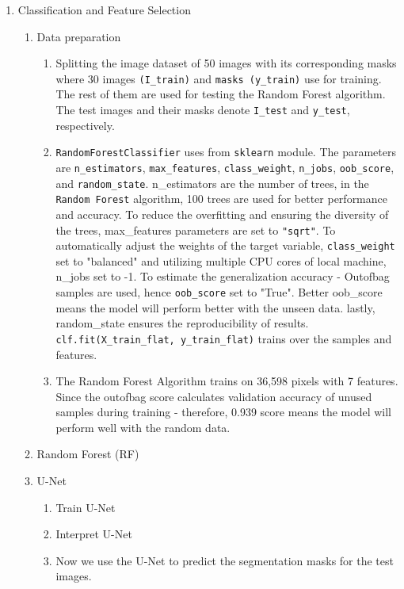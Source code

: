 \documentclass[
    a4paper,
    12pt,
    parskip=half,
]{scrarticle}
\begin{document}
\begin{enumerate}
    \item Classification and Feature Selection
    \begin{enumerate}[label=\theenumi.\arabic*.]
        \item Data preparation
        \begin{enumerate}[label=\alph*)]
            \item Splitting the image dataset of 50 images with its corresponding masks where 30 images \texttt{(I\_train)}  and \texttt{masks (y\_train)} use for training. The rest of them are used for testing the Random Forest algorithm. The test images and their masks denote \texttt{I\_test} and \texttt{y\_test}, respectively.

            \item \texttt{RandomForestClassifier} uses from \texttt{sklearn} module. The parameters are \texttt{n\_estimators}, \texttt{max\_features}, \texttt{class\_weight}, \texttt{n\_jobs}, \texttt{oob\_score}, and \texttt{random\_state}. n\_estimators are the number of trees, in the \texttt{Random Forest} algorithm, 100 trees are used for better performance and accuracy.
            To reduce the overfitting and ensuring the diversity of the trees, max\_features parameters are set to \texttt{"sqrt"}. To automatically adjust the weights of the target variable, \texttt{class\_weight} set to "balanced" and utilizing multiple CPU cores of local machine, n\_jobs set to -1. To estimate the generalization accuracy - Out\-of\-bag samples are used, hence \texttt{oob\_score} set to "True". Better oob\_score means the model will perform better with the unseen data. lastly, random\_state ensures the reproducibility of results. \texttt{clf.fit(X\_train\_flat, y\_train\_flat)} trains over the samples and features. 
            \item The Random Forest Algorithm trains on 36,598 pixels with 7 features. Since the out\-of\-bag score calculates validation accuracy of unused samples during training - therefore, 0.939 score means the model will perform well with the random data.
        \end{enumerate}
        \item Random Forest (RF)
        \item U-Net
        \begin{enumerate}[label=\alph*)]
            \item Train U-Net
            \item Interpret U-Net
            \item Now we use the U-Net to predict the segmentation masks for the test images.

\end{enumerate}
\end{enumerate}
\end{enumerate}
\end{document}
